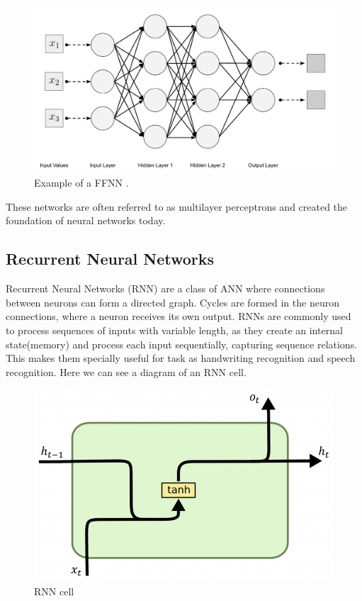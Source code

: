 \documentclass{kththesis}
\begin{document}
\begin{figure}[H]
    \centering
    \includegraphics[width=0.6\linewidth]{fnn.png}
    \caption{Example of a FFNN \cite{ffnn}.}
    \label{FFNN}
\end{figure}

These networks are often referred to as multilayer perceptrons and created the foundation of neural networks today.

\subsection{Recurrent Neural Networks}

Recurrent Neural Networks (RNN) are a class of ANN where connections between neurons can form a directed graph. Cycles are formed in the neuron connections, where a neuron receives its own output. RNNs are commonly used to process sequences of inputs with variable length, as they create an internal state(memory) and process each input sequentially, capturing sequence relations. This makes them specially useful for task as handwriting recognition\cite{rnn-hand} and speech recognition\cite{rnn-speech}. Here we can see a diagram of an RNN cell.

\begin{figure}[H]
    \centering
    \includegraphics[width=\textwidth]{images/RNN_core.png}
    \caption{RNN cell \cite{daniel}}
    \label{RNN}
\end{figure}
\end{document}

